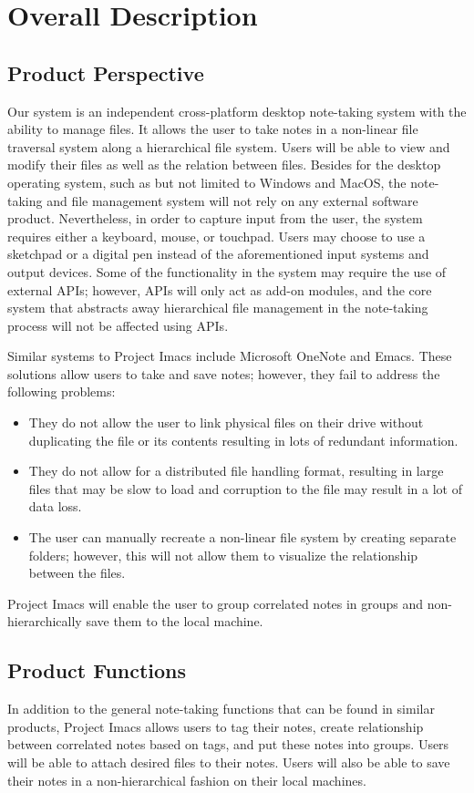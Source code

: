 \documentclass{article}
\begin{document}
\section{Overall Description}
\subsection{Product Perspective}
Our system is an independent cross-platform desktop note-taking system with the ability to manage files. It allows the user to take notes in a non-linear file traversal system along a hierarchical file system. Users will be able to view and modify their files as well as the relation between files. Besides for the desktop operating system, such as but not limited to Windows and MacOS, the note-taking and file management system will not rely on any external software product. Nevertheless, in order to capture input from the user, the system requires either a keyboard, mouse, or touchpad. Users may choose to use a sketchpad or a digital pen instead of the aforementioned input systems and output devices. Some of the functionality in the system may require the use of external APIs; however, APIs will only act as add-on modules, and the core system that abstracts away hierarchical file management in the note-taking process will not be affected using APIs.

Similar systems to Project Imacs include Microsoft OneNote and Emacs. These solutions allow users to take and save notes; however, they fail to address the following problems:

\begin{itemize}
\item They do not allow the user to link physical files on their drive without duplicating the file or its contents resulting in lots of redundant information.
\item They do not allow for a distributed file handling format, resulting in large files that may be slow to load and corruption to the file may result in a lot of data loss.
\item The user can manually recreate a non-linear file system by creating separate folders; however, this will not allow them to visualize the relationship between the files.
\end{itemize}

Project Imacs will enable the user to group correlated notes in groups and non-hierarchically save them to the local machine.

\subsection{Product Functions}
In addition to the general note-taking functions that can be found in similar products, Project Imacs allows users to tag their notes, create relationship between correlated notes based on tags, and put these notes into groups. Users will be able to attach desired files to their notes. Users will also be able to save their notes in a non-hierarchical fashion on their local machines.
\end{document}
